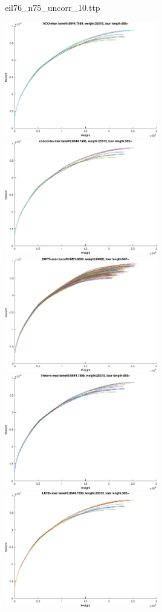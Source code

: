 \documentclass{article}
\begin{document}
\newpage
eil76\_n75\_uncorr\_10.ttp

\noindent
\includegraphics[width=0.5\textwidth]{eil76figs/eil76_n75_uncorr_10.ttp.aco.txt.eps}
\includegraphics[width=0.5\textwidth]{eil76figs/eil76_n75_uncorr_10.ttp.con.txt.eps}
\includegraphics[width=0.5\textwidth]{eil76figs/eil76_n75_uncorr_10.ttp.inv.txt.eps}
\includegraphics[width=0.5\textwidth]{eil76figs/eil76_n75_uncorr_10.ttp.lkh.txt.eps}
\includegraphics[width=0.5\textwidth]{eil76figs/eil76_n75_uncorr_10.ttp.lkh2.txt.eps}
\end{document}

